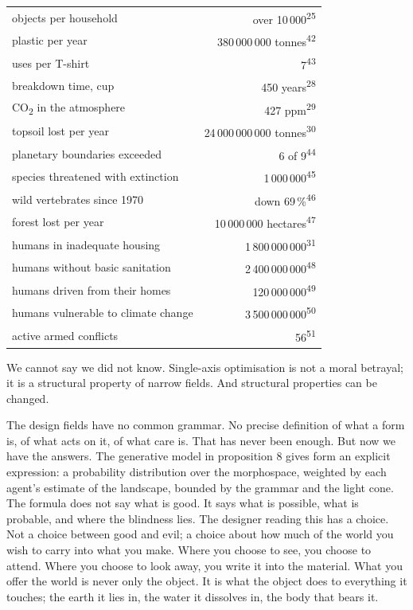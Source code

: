 \begin{widebody}
{\bigskip
\begin{center}
\footnotesize
\renewcommand{\arraystretch}{1.15}
\begin{tabular}{@{}p{46mm}r@{}}
\toprule
objects per household & over 10\,000\textsuperscript{25} \\
plastic per year & 380\,000\,000 tonnes\textsuperscript{42} \\
uses per T-shirt & 7\textsuperscript{43} \\
breakdown time, cup & 450 years\textsuperscript{28} \\
CO\textsubscript{2} in the atmosphere & 427 ppm\textsuperscript{29} \\
topsoil lost per year & 24\,000\,000\,000 tonnes\textsuperscript{30} \\
planetary boundaries exceeded & 6 of 9\textsuperscript{44} \\
species threatened with extinction & 1\,000\,000\textsuperscript{45} \\
wild vertebrates since 1970 & down 69\,\%\textsuperscript{46} \\
forest lost per year & 10\,000\,000 hectares\textsuperscript{47} \\
humans in inadequate housing & 1\,800\,000\,000\textsuperscript{31} \\
humans without basic sanitation & 2\,400\,000\,000\textsuperscript{48} \\
humans driven from their homes & 120\,000\,000\textsuperscript{49} \\
humans vulnerable to climate change & 3\,500\,000\,000\textsuperscript{50} \\
active armed conflicts & 56\textsuperscript{51} \\
\bottomrule
\end{tabular}
\end{center}
\bigskip

We cannot say we did not know. Single-axis optimisation is not a moral betrayal; it is a structural property of narrow fields. And structural properties can be changed.

The design fields have no common grammar. No precise definition of what a form is, of what acts on it, of what care is. That has never been enough. But now we have the answers. The generative model in proposition 8 gives form an explicit expression: a probability distribution over the morphospace, weighted by each agent's estimate of the landscape, bounded by the grammar and the light cone. The formula does not say what is good. It says what is possible, what is probable, and where the blindness lies. The designer reading this has a choice. Not a choice between good and evil; a choice about how much of the world you wish to carry into what you make. Where you choose to see, you choose to attend. Where you choose to look away, you write it into the material. What you offer the world is never only the object. It is what the object does to everything it touches; the earth it lies in, the water it dissolves in, the body that bears it.

}
\end{widebody}
